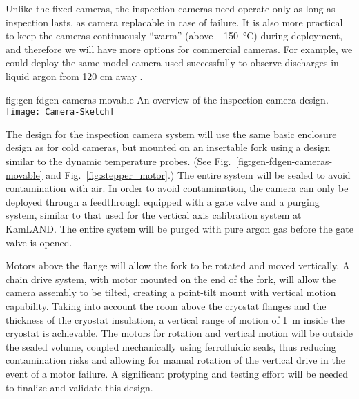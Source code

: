 Unlike the fixed cameras, the inspection cameras need operate only as
long as inspection lasts, as camera replacable in case of failure.  It
is also more practical to keep the cameras continuously ``warm''
(above \SI{-150}{\celsius}) during deployment, and therefore we will
have more options for commercial cameras.  For example, we could
deploy the same model camera used successfully to observe discharges
in liquid argon from 120 cm away \cite{Auger:2015xlo}.

\begin{dunefigure}{fig:gen-fdgen-cameras-movable}
  {An overview of the inspection camera design.}
  \texttt{[image: Camera-Sketch]}%
\end{dunefigure}

The design for the inspection camera system will use the same basic
enclosure design as for cold cameras, but mounted on an insertable
fork using a design similar to the dynamic temperature probes. (See
Fig.\ \ref{fig:gen-fdgen-cameras-movable} and
Fig.\ \ref{fig:stepper_motor}.)  The entire system will be sealed to
avoid contamination with air. In order to avoid contamination, the
camera can only be deployed through a feedthrough equipped with a gate
valve and a purging system, similar to that used for the vertical axis
calibration system at KamLAND\cite{Banksy:2014hra}. The entire system
will be purged with pure argon gas before the gate valve is opened.

Motors above the flange will allow the fork to be
rotated and moved vertically.  A chain drive system, with motor
mounted on the end of the fork, will allow the camera assembly to be
tilted, creating a point-tilt mount with vertical motion capability.
Taking into account the room above the cryostat flanges and the
thickness of the cryostat insulation, a vertical range of motion of
\SI{1}{m} inside the cryostat is achievable.
The motors for rotation and vertical motion will be outside the sealed
volume, coupled mechanically using ferrofluidic seals, thus reducing
contamination risks and allowing for manual rotation of the vertical
drive in the event of a motor failure.  A significant protyping and
testing effort will be needed to finalize and validate this design.

